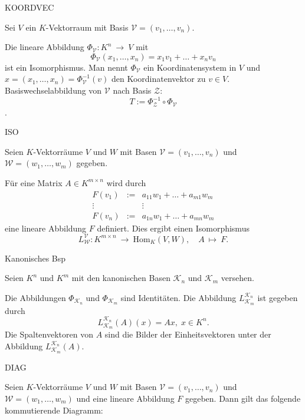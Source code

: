 \documentclass[fontsize=12pt,paper=a4,twoside,bibtotoc,idxtotoc,
liststotoc,pagesize,BCOR1.2cm,DIV15,chapterprefix,pagesize=pdftex]{scrbook}
\theoremstyle{plain}
\theoremstyle{definition}
\theoremstyle{remark}
\begin{document}
KOORDVEC

Sei $V$ ein $K$-Vektorraum mit Basis $\mathcal{V}=(v_1, \dots
,v_n)$.

 Die lineare Abbildung 
$\Phi_\mathcal{V}:K^n \ \rightarrow \ V$ mit
\[\Phi_\mathcal{V}(x_1,\dots ,x_n)=x_1v_1+ \dots +x_nv_n\]
ist ein Isomorphismus. Man nennt $\Phi_\mathcal{V}$ ein
{\color{red} Koordinatensystem} in $V$ und $x=(x_1,\dots ,x_n)=\Phi_\mathcal{V}^{-1}(v)$
den {\color{red} Koordinatenvektor} zu $v \in V$.
 Basiswechselabbildung von $\mathcal{V}$ nach Basis $\mathcal{Z}$:
\[T:= \Phi_\mathcal{Z}^{-1} \circ \Phi_\mathcal{V}\].


ISO

Seien $K$-Vektorräume $V$ und $W$ mit Basen $\mathcal{V}=(v_1, \dots
,v_n)$ und $\mathcal{W}=(w_1, \dots ,w_m)$ gegeben. 

 Für eine Matrix $A\in K^{m
 \times n}$ wird durch
\begin{eqnarray*}
F(v_1) & := & a_{11}w_1 + \dots +a_{m1} w_m\\
\vdots &    & \vdots     \\
F(v_n) & := & a_{1n} w_1 + \dots + a_{mn}w_m
\end{eqnarray*}
eine lineare Abbildung $F$ definiert. Dies ergibt einen Isomorphismus
\[
L^\mathcal{V}_\mathcal{W}: K^{m \times n} \ \rightarrow \
\mathrm{Hom}_K(V,W), \quad A \ \mapsto \ F.
\] 

Kanonisches Bsp

Seien $K^n$ und $K^m$ mit den kanonischen Basen $\mathcal{K}_n$ und
$\mathcal{K}_m$ versehen.

 Die Abbildungen $\Phi_{\mathcal{K}_n}$ und $\Phi_{\mathcal{K}_m}$
sind Identitäten.
  Die Abbildung $L^{\mathcal{K}_n}_{\mathcal{K}_m}$ ist gegeben
durch 
\[ L^{\mathcal{K}_n}_{\mathcal{K}_m} (A)(x)=Ax,\; x \in K^n. \]
 Die Spaltenvektoren von $A$ sind die Bilder der Einheitsvektoren
unter der Abbildung  $L^{\mathcal{K}_n}_{\mathcal{K}_m}(A)$.


DIAG

Seien $K$-Vektorräume $V$ und $W$ mit Basen $\mathcal{V}=(v_1, \dots
,v_n)$ und $\mathcal{W}=(w_1, \dots ,w_m)$ und eine lineare Abbildung
$F$ gegeben. Dann gilt das folgende kommutierende Diagramm:\\
\begin{center}
\end{center}
\end{document}
